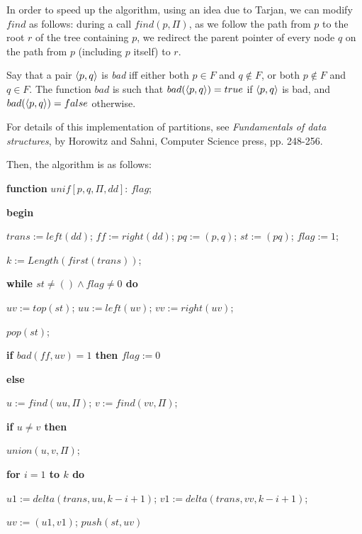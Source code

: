 \documentclass[12pt]{article}
\begin{document}
\medskip
In order to speed up the algorithm, using an idea due to  Tarjan, 
we can modify $find$ as follows:
during a call $find(p,\Pi)$, as we follow the path from $p$ to
the root $r$ of the tree containing $p$, we redirect the parent pointer
of every node $q$ on the path from $p$ (including $p$ itself) to
$r$.

\medskip
Say that a pair $\langle p, q\rangle$ is {\it bad\/} iff either
both $p\in F$ and $q\notin F$, or both $p\notin F$ and $q \in F$.
The function $bad$ is such that $bad(\langle p, q\rangle) = true$ if 
$\langle p, q\rangle$ is bad, and $bad(\langle p, q\rangle) = false$
otherwise.

\medskip
For details of this implementation of partitions, see
{\sl Fundamentals of data structures}, by Horowitz and Sahni,
Computer Science press, pp. 248-256.

\medskip
Then, the algorithm is as follows:

\vfill\eject\noindent

\medskip
{\bf function} $unif[p, q, \Pi, dd]$: $flag$;

\smallskip
\quad 
{\bf begin}

\smallskip
\quad \quad
$trans := left(dd)$; $ff := right(dd)$;  $pq := (p, q)$; 
$st := (pq)$; $flag := 1$;

\smallskip
\quad\quad
 $k:= Length(first(trans))$;

\smallskip
\quad\quad
 {\bf while $st \not= () \land  flag \not= 0$ do}

\smallskip
\quad\quad\quad
       $uv := top(st)$; $uu := left(uv)$; $vv := right(uv)$;

\smallskip
\quad\quad\quad
       $pop(st)$;

\smallskip
\quad\quad\quad
       {\bf if $bad(ff, uv) = 1$ then  $flag := 0$}

\smallskip
\quad\quad\quad
       {\bf else} 

\smallskip
\quad\quad\quad\quad
         $u := find(uu, \Pi)$; $v := find(vv, \Pi)$;

\smallskip
\quad\quad\quad\quad
          {\bf if $u \not= v$ then}

\smallskip
\quad\quad\quad\quad\quad
                 $union(u,v,\Pi)$;

\smallskip
\quad\quad\quad\quad\quad
                {\bf for $i = 1$ to $k$ do}

\smallskip
\quad\quad\quad\quad\quad\quad
      $u1 := delta(trans,uu,k-i+1)$; $v1 := delta(trans,vv,k-i+1)$;

\smallskip
\quad\quad\quad\quad\quad\quad
      $uv := (u1, v1)$; $push(st,uv)$
\end{document}
